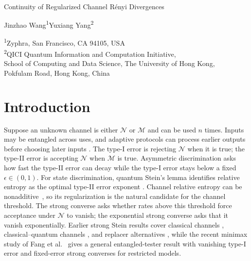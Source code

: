 \documentclass[11pt,letterpaper]{article}
\numberwithin{equation}{section}
\newcommand{\N}{\mathcal N}
\newcommand{\M}{\mathcal M}
\begin{document}
\begin{center}
{\LARGE Continuity of Regularized Channel R\'enyi Divergences\par}
\vspace{8pt}
{\large Jinzhao Wang\textsuperscript{1}\qquad Yuxiang Yang\textsuperscript{2}\par}
\vspace{5pt}
{\small
\textsuperscript{1}Zyphra, San Francisco, CA 94105, USA\\
\textsuperscript{2}QICI Quantum Information and Computation Initiative,\\
School of Computing and Data Science, The University of Hong Kong,\\
Pokfulam Road, Hong Kong, China\par}
\end{center}
\vspace{2pt}
\begin{abstract}
We prove that the regularized, stabilized sandwiched R\'enyi divergence of finite-dimensional quantum channels converges to their regularized relative entropy as the R\'enyi order tends to one. The key tool is the channel hockey-stick divergence: Gour's Stinespring approximation bound and a Schatten norm estimate amplify an asymptotic bound below one into exponential decay at higher threshold rates. For channel pairs with finite max-relative entropy, known operational connections then give exponential strong converses for parallel and adaptive discrimination, a sharp zero--one testing law, and the subchannel asymptotic equipartition property.
\end{abstract}

\section{Introduction}\label{sec:problem}
Suppose an unknown channel is either $\N$ or $\M$ and can be used $n$ times. Inputs may be entangled across uses, and adaptive protocols can process earlier outputs before choosing later inputs \cite{WBHK}. The type-I error is rejecting $\N$ when it is true; the type-II error is accepting $\N$ when $\M$ is true. Asymmetric discrimination asks how fast the type-II error can decay while the type-I error stays below a fixed $\epsilon\in(0,1)$. For state discrimination, quantum Stein's lemma identifies relative entropy as the optimal type-II error exponent \cite{HP,ON}. Channel relative entropy can be nonadditive~\cite{FFRS}, so its regularization is the natural candidate for the channel threshold. The strong converse asks whether rates above this threshold force acceptance under $\N$ to vanish; the exponential strong converse asks that it vanish exponentially. Earlier strong Stein results cover classical channels \cite{Hayashi}, classical--quantum channels \cite{WBHK}, and replacer alternatives \cite{CMW}, while the recent minimax study of Fang et al.~\cite{FCCGH} gives a general entangled-tester result with vanishing type-I error and fixed-error strong converses for restricted models.
\end{document}
